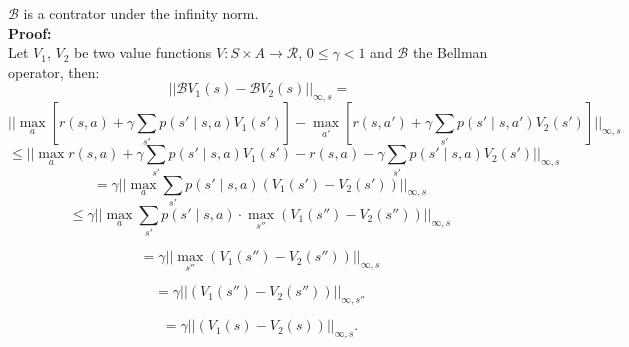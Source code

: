 $\mathcal{B}$ is a contrator under the infinity norm.\\
\textbf{Proof:}\\
Let $V_1$, $V_2$ be two value functions $V : S \times A \to \mathcal{R}$, $0 \leq \gamma < 1$ and $\mathcal{B}$ the Bellman operator, then:
\begin{equation}
||\mathcal{B}V_1(s) - \mathcal{B}V_2(s)||_{\infty, s} = 
\end{equation}
\begin{equation}
    ||\max_a[ r(s,a) + \gamma \sum_{s'} p(s' \mid s,a) V_1(s')] - \max_{a'}[ r(s,a') + \gamma \sum_{s'} p(s' \mid s,a') V_2(s') ] ||_{\infty, s}
\end{equation}
\begin{equation}
    \leq ||\max_a r(s,a) + \gamma \sum_{s'} p(s' \mid s,a) V_1(s') - r(s,a) - \gamma \sum_{s'} p(s' \mid s,a) V_2(s')||_{\infty, s}
\end{equation}
\begin{equation}
= \gamma ||\max_a \sum_{s'} p(s' \mid s,a) (V_1(s') -V_2(s'))||_{\infty, s}
\end{equation}
\begin{equation}
\leq \gamma ||\max_a \sum_{s'} p(s' \mid s,a) \cdot \max_{s''} (V_1(s'') -V_2(s''))||_{\infty, s}
\end{equation}

\begin{equation}
= \gamma ||\max_{s''} (V_1(s'') - V_2(s''))||_{\infty, s}
\end{equation}

\begin{equation}
= \gamma ||(V_1(s'') - V_2(s''))||_{\infty, s''}
\end{equation}

\begin{equation}
= \gamma ||(V_1(s) - V_2(s))||_{\infty, s}.
\end{equation}

